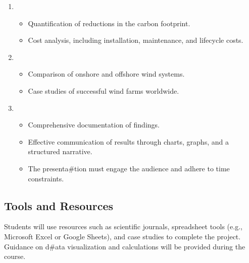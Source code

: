 \documentclass[letterpaper,10pt,english]{jupyterBook}
\begin{document}
\begin{enumerate}
\item {} 
\sphinxAtStartPar
{}
\begin{itemize}
\item {} 
\sphinxAtStartPar
Quantification of reductions in the carbon footprint.

\item {} 
\sphinxAtStartPar
Cost analysis, including installation, maintenance, and
lifecycle costs.

\end{itemize}

\item {} 
\sphinxAtStartPar
{}
\begin{itemize}
\item {} 
\sphinxAtStartPar
Comparison of onshore and offshore wind systems.

\item {} 
\sphinxAtStartPar
Case studies of successful wind farms worldwide.

\end{itemize}

\item {} 
\sphinxAtStartPar
{}
\begin{itemize}
\item {} 
\sphinxAtStartPar
Comprehensive documentation of findings.

\item {} 
\sphinxAtStartPar
Effective communication of results through charts, graphs, and a
structured narrative.

\item {} 
\sphinxAtStartPar
The presenta\#tion must engage the audience and adhere to time
constraints.

\end{itemize}

\end{enumerate}


\subsection{Tools and Resources}
\label{\detokenize{ProjectInstructions:id28}}
\sphinxAtStartPar
Students will use resources such as scientific journals, spreadsheet
tools (e.g., Microsoft Excel or Google Sheets), and case studies to
complete the project. Guidance on d\#ata visualization and calculations
will be provided during the course.
\end{document}
